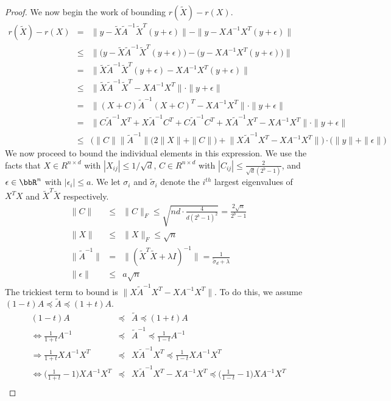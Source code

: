 \documentclass[12pt]{article}
\newcommand{\tsigma}{\tilde{\sigma}}
\newcommand{\eps}{\epsilon}
\newcommand{\tA}{\tilde{A}}
\newcommand{\tX}{\tilde{X}}
\begin{document}
\begin{proof}
\noindent We now begin the work of bounding $r(\tX) - r(X)$.
\begin{eqnarray*}
r(\tX) - r(X) &=& \|y-\tX\tA^{-1} \tX^T (y+\eps)\| - \|y-X A^{-1} X^T (y+\eps)\| \\
&\leq& \Big\|\Big(y-\tX\tA^{-1} \tX^T (y+\eps)\Big) - \Big(y - X A^{-1} X^T (y+\eps)\Big)\Big\| \\
&=& \|\tX\tA^{-1} \tX^T (y+\eps) - X A^{-1} X^T(y+\eps)\| \\
&\leq& \big\|\tX\tA^{-1} \tX^T - X A^{-1} X^T\big\|\cdot \|y + \eps\| \\
&=& \big\|(X+C)\tA^{-1} (X+C)^T - X A^{-1} X^T\big\|\cdot \|y + \eps\| \\
&=& \big\|C \tA^{-1} X^T + X \tA^{-1} C^T + C \tA^{-1} C^T + X \tA^{-1} X^T - X A^{-1} X^T\big\|\cdot \|y + \eps\| \\
&\leq& \bigg(\|C\| \|\tA^{-1}\|\Big(2\|X\| + \|C\|\Big) + \big\|X \tA^{-1} X^T - X A^{-1} X^T\big\|\bigg)\cdot \big(\|y\| + \|\eps\|\big) 
\end{eqnarray*}
We now proceed to bound the individual elements in this expression. We use the facts that $X \in R^{n \times d}$ with $|X_{ij}| \leq 1/\sqrt{d}$,
$C \in R^{n \times d}$ with $|C_{ij}|\leq \frac{2}{\sqrt{d}(2^b-1)}$, and $\eps \in \RR^n$ with $|\eps_i| \leq a$.  We let $\sigma_i$ and $\tsigma_i$ denote the $i^{th}$ largest eigenvalues of $X^T X$ and $\tX^T \tX$ respectively.
\begin{eqnarray*}
\|C\| &\leq& \|C\|_F \leq \sqrt{nd \cdot \frac{4}{d(2^b-1)^2}} = \frac{2\sqrt{n}}{2^b-1} \\
\|X\| &\leq& \|X\|_F \leq \sqrt{n}\\
\|\tA^{-1}\| &=& \|(\tX^T\tX + \lambda I)^{-1}\|  = \frac{1}{\tsigma_d + \lambda} \\
\|\eps\| &\leq& a\sqrt{n}
\end{eqnarray*}
The trickiest term to bound is $\big\|X \tA^{-1} X^T - X A^{-1} X^T\big\|$.  To do this, we assume $(1-t)A \preceq \tA \preceq (1+t)A$.
\begin{eqnarray*}
(1-t)A &\preceq& \tA \preceq (1+t)A\\
\Longleftrightarrow \frac{1}{1+t}A^{-1} &\preceq& \tA^{-1} \preceq \frac{1}{1-t}A^{-1} \\
\Longrightarrow \frac{1}{1+t} X A^{-1}X^T &\preceq& X \tA^{-1}X^T  \preceq \frac{1}{1-t}X A^{-1}X^T \\
\Longleftrightarrow \Big(\frac{1}{1+t} - 1\Big)X A^{-1}X^T &\preceq& X \tA^{-1}X^T - XA^{-1}X^T \preceq \Big(\frac{1}{1-t}-1\Big)X A^{-1}X^T \\

\end{eqnarray*}
\end{proof}
\end{document}
